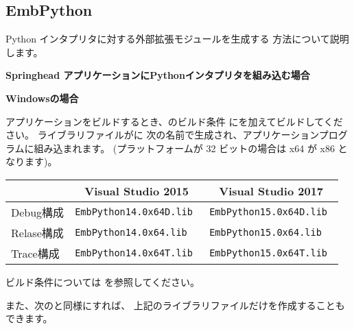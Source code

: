 \newpage
\subsection{EmbPython}
\label{subsec:EmbPython}
\parindent=0pt

Python インタプリタに対する外部拡張モジュールを生成する 方法について説明します。

\medskip
\thinrule{\linewidth}

\noindent
\bf{Springhead アプリケーションにPythonインタプリタを組み込む場合}

\bigskip
\bf{Windowsの場合}
\begin{narrow}
	アプリケーションをビルドするとき、\QCMakeSettings{}のビルド条件
	にを加えてビルドしてください。
	ライブラリファイルがに
	次の名前で生成され、アプリケーションプログラムに組み込まれます。
 	(プラットフォームが 32 ビットの場合は x64 が x86 となります)。
	
	\medskip
	\begin{narrow}[20pt]
	\begin{tabular}{l@{\ \ ---\ \ }ll}\hline
	    & \multicolumn{1}{c}{Visual Studio 2015}
	    & \multicolumn{1}{c}{Visual Studio 2017} \\\hline
	    Debug構成 & \tt{EmbPython14.0x64D.lib} & \tt{EmbPython15.0x64D.lib} \\
	    Relase構成 & \tt{EmbPython14.0x64.lib} & \tt{EmbPython15.0x64.lib} \\
	    Trace構成 & \tt{EmbPython14.0x64T.lib} & \tt{EmbPython15.0x64T.lib} \\\hline
	\end{tabular}
	\end{narrow}

	\bigskip
	ビルド条件については
	を参照してください。

	また、次のと同様にすれば、
	上記のライブラリファイルだけを作成することもできます。
\end{narrow}

